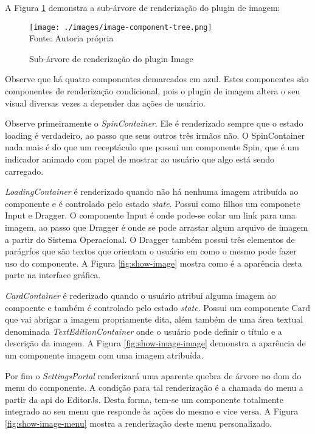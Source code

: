 
A
Figura \ref{fig:image-component-tree}
demonstra a sub-árvore de renderização do plugin de imagem:

\begin{figure}[H]
    \centering
    \caption{Sub-árvore de renderização do plugin Image}
    \texttt{[image: ./images/image-component-tree.png]}
    \label{fig:image-component-tree} \\
    \textnormal{\fontsize{10pt}{12pt}Fonte: Autoria própria}
\end{figure}

Observe que há quatro componentes demarcados em azul. Estes componentes
são componentes de renderização condicional, pois o plugin de imagem
altera o seu visual diversas vezes a depender das ações de usuário.

Observe primeiramente o \textit{SpinContainer}. Ele é renderizado sempre que
o estado loading é verdadeiro, ao passo que seus outros três irmãos não.
O SpinContainer nada mais é do que um receptáculo que possui um componente
Spin, que é um indicador animado com papel de mostrar ao usuário que algo está
sendo carregado.

\textit{LoadingContainer} é renderizado quando não há nenhuma imagem atribuída ao componente
e é controlado pelo estado \textit{state}. Possui como filhos um componete Input e Dragger.
O componente Input é onde pode-se colar um link para uma imagem, ao passo que Dragger é
onde se pode arrastar algum arquivo de imagem a partir do Sistema Operacional. O Dragger
também possui três elementos de parágrfos que são textos que orientam o usuário em como
o mesmo pode fazer uso do componente. A
Figura \ref{fig:show-image}
mostra como é a aparência desta parte na interface gráfica.

\textit{CardContainer} é rederizado quando o usuário atribui alguma imagem ao compoente e também
é controlado pelo estado \textit{state}.
Possui um componente Card que vai abrigar a imagem propriamente dita, além também de uma área
textual denominada \textit{TextEditionContainer} onde o usuário pode definir o título e a descrição
da imagem. A
Figura \ref{fig:show-image-image}
demonstra a aparência de um componente imagem com uma imagem atribuída.

Por fim o \textit{SettingsPortal} renderizará uma aparente quebra de árvore no
\acrshort{dom}
do menu do componente. A condição para tal renderização é a chamada do menu
a partir da
\acrshort{api}
do EditorJs. Desta forma, tem-se um componente totalmente integrado ao seu
menu que responde às ações do mesmo e vice versa.
A
Figura \ref{fig:show-image-menu}
mostra a renderização deste menu personalizado.

